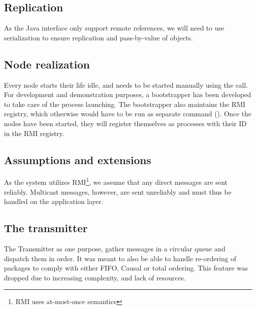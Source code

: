 \documentclass[10pt,a4paper]{article}
\begin{document}
\subsection{Replication}
As the Java interface  only support remote references, we will need to use serialization to ensure replication and pass-by-value of objects.

\subsection{Node realization}
Every node starts their life idle, and needs to be started manually using the  call. For development and demonstration purposes, a bootstrapper has been developed to take care of the process launching. The bootstrapper also maintains the RMI registry, which otherwise would have to be run as separate command ().
Once the nodes have been started, they will register themselves as processes with their ID in the RMI registry.

\subsection{Assumptions and extensions}
As the system utilizes RMI\footnote{RMI uses at-most-once semantics}, we assume that any direct messages are sent reliably. Multicast messages, however, are sent unreliably and must thus be handled on the application layer.\\


\subsection{The transmitter}
The Transmitter as one purpose, gather messages in a circular queue and dispatch them in order. It was meant to also be able to handle re-ordering of packages to comply with either FIFO, Causal or total ordering. This feature was dropped due to increasing complexity, and lack of resources.
\end{document}
